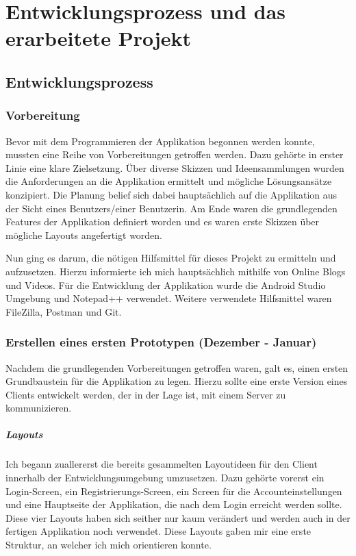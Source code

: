 \documentclass[../main.tex]{subfiles}
\begin{document}
	
	\chapter{Entwicklungsprozess und das erarbeitete Projekt}
	
	\section{Entwicklungsprozess}
	
	\subsection{Vorbereitung}
	Bevor mit dem Programmieren der Applikation begonnen werden konnte, mussten eine Reihe von Vorbereitungen getroffen werden. Dazu gehörte in erster Linie eine klare Zielsetzung. Über diverse Skizzen und Ideensammlungen wurden die Anforderungen an die Applikation ermittelt und mögliche Lösungsansätze konzipiert. Die Planung belief sich dabei hauptsächlich auf die Applikation aus der Sicht eines Benutzers/einer Benutzerin. Am Ende waren die grundlegenden Features der Applikation definiert worden und es waren erste Skizzen über mögliche Layouts angefertigt worden.
	
	Nun ging es darum, die nötigen Hilfsmittel für dieses Projekt zu ermitteln und aufzusetzen. Hierzu informierte ich mich hauptsächlich mithilfe von Online Blogs und Videos. Für die Entwicklung der Applikation wurde die Android Studio Umgebung und Notepad++ verwendet. Weitere verwendete Hilfsmittel waren FileZilla, Postman und Git.
	
	\subsection{Erstellen eines ersten Prototypen (Dezember - Januar)}
	Nachdem die grundlegenden Vorbereitungen getroffen waren, galt es, einen ersten Grundbaustein für die Applikation zu legen. Hierzu sollte eine erste Version eines Clients entwickelt werden, der in der Lage ist, mit einem Server zu kommunizieren.
	
	\paragraph{Layouts}
	Ich begann zuallererst die bereits gesammelten Layoutideen für den Client innerhalb der Entwicklungsumgebung umzusetzen. Dazu gehörte vorerst ein Login-Screen, ein Registrierungs-Screen, ein Screen für die Accounteinstellungen und eine Hauptseite der Applikation, die nach dem Login erreicht werden sollte. Diese vier Layouts haben sich seither nur kaum verändert und werden auch in der fertigen Applikation noch verwendet. Diese Layouts gaben mir eine erste Struktur, an welcher ich mich orientieren konnte.
	
\end{document}
